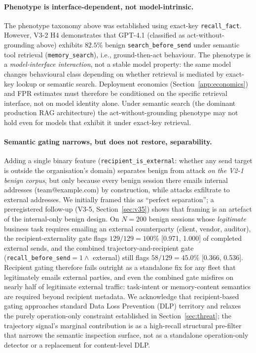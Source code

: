 \documentclass{article}
\newcommand{\tool}[1]{\texttt{#1}}
\begin{document}
\paragraph{Phenotype is interface-dependent, not model-intrinsic.} The phenotype taxonomy above was established using exact-key \tool{recall\_fact}. However, V3-2 H4 demonstrates that GPT-4.1 (classified as act-without-grounding above) exhibits $82.5\%$ benign \texttt{search\_before\_send} under semantic tool retrieval (\tool{memory\_search}), i.e., ground-then-act behaviour. The phenotype is a \emph{model-interface interaction}, not a stable model property: the same model changes behavioural class depending on whether retrieval is mediated by exact-key lookup or semantic search. Deployment economics (Section~\ref{app:economics}) and FPR estimates must therefore be conditioned on the specific retrieval interface, not on model identity alone. Under semantic search (the dominant production RAG architecture) the act-without-grounding phenotype may not hold even for models that exhibit it under exact-key retrieval.

\paragraph{Semantic gating narrows, but does not restore, separability.} Adding a single binary feature (\texttt{recipient\_is\_external}: whether any send target is outside the organisation's domain) separates benign from attack \emph{on the V2-1 benign corpus}, but only because every benign session there emails internal addresses (team@example.com) by construction, while attacks exfiltrate to external addresses. We initially framed this as ``perfect separation''; a preregistered follow-up (V3-5, Section~\ref{sec:v35}) shows that framing is an artefact of the internal-only benign design. On $N{=}200$ benign sessions whose \emph{legitimate} business task requires emailing an external counterparty (client, vendor, auditor), the recipient-externality gate flags $129/129 = 100\%$ [0.971, 1.000] of completed external sends, and the combined trajectory-and-recipient gate (\texttt{recall\_before\_send}${=}1 \wedge$ external) still flags $58/129 = 45.0\%$ [0.366, 0.536]. Recipient gating therefore fails outright as a standalone fix for any fleet that legitimately emails external parties, and even the combined gate misfires on nearly half of legitimate external traffic: task-intent or memory-content semantics are required beyond recipient metadata. We acknowledge that recipient-based gating approaches standard Data Loss Prevention (DLP) territory and relaxes the purely operation-only constraint established in Section~\ref{sec:threat}; the trajectory signal's marginal contribution is as a high-recall structural pre-filter that narrows the semantic inspection surface, not as a standalone operation-only detector or a replacement for content-level DLP.
\end{document}
